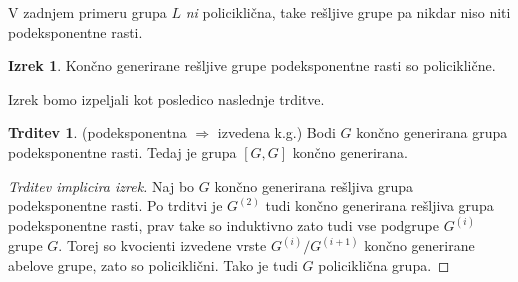 \documentclass[11pt]{book}
\theoremstyle{definition}
\theoremstyle{zgled}
\theoremstyle{odprtproblem}
\theoremstyle{domacanaloga}
\newenvironment{dokaz}
    {\color{siva}\begin{proof}}
    {\end{proof}}
\theoremstyle{izrek}
\newtheorem*{izrek}{Izrek}
\newtheorem*{trditev}{Trditev}
\begin{document}
V zadnjem primeru grupa $L$ {\em ni} policiklična, take rešljive grupe pa nikdar niso niti podeksponentne rasti.

\begin{izrek}
Končno generirane rešljive grupe podeksponentne rasti so policiklične.
\end{izrek}

Izrek bomo izpeljali kot posledico naslednje trditve.

\begin{trditev}{\sc (podeksponentna $\Rightarrow$ izvedena k.g.)}
Bodi $G$ končno generirana grupa podeksponentne rasti. Tedaj je grupa $[G,G]$ končno generirana.
\end{trditev}

\begin{dokaz}[Trditev implicira izrek]
Naj bo $G$ končno generirana rešljiva grupa podeksponentne rasti. Po trditvi je $G^{(2)}$ tudi končno generirana rešljiva grupa podeksponentne rasti, prav take so induktivno zato tudi vse podgrupe $G^{(i)}$ grupe $G$. Torej so kvocienti izvedene vrste $G^{(i)}/G^{(i+1)}$ končno generirane abelove grupe, zato so policiklični. Tako je tudi $G$ policiklična grupa.
\end{dokaz}
\end{document}
